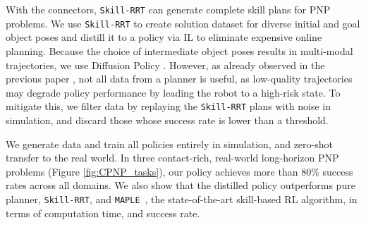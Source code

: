 With the connectors, \texttt{Skill-RRT} can generate complete skill plans for PNP problems. We use \texttt{Skill-RRT} to create solution dataset for diverse initial and goal object poses and distill it to a policy via IL to eliminate expensive online planning. Because the choice of intermediate object poses results in multi-modal trajectories, we use Diffusion Policy \cite{chi2023diffusion}. However, as already observed in the previous paper \cite{dalal2023imitating}, not all data from a planner is useful, as low-quality trajectories may degrade policy performance by leading the robot to a high-risk state. To mitigate this, we filter data by replaying the \texttt{Skill-RRT} plans with noise in simulation, and discard those whose success rate is lower than a threshold. 

We generate data and train all policies entirely in simulation, and zero-shot transfer to the real world. In three contact-rich, real-world long-horizon PNP problems (Figure \ref{fig:CPNP_tasks}), our policy achieves more than 80\% success rates across all domains. We also show that the distilled policy outperforms pure planner, \texttt{Skill-RRT}, and \texttt{MAPLE}~\cite{nasiriany2022augmenting}, the state-of-the-art skill-based RL algorithm, in terms of computation time, and success rate.

